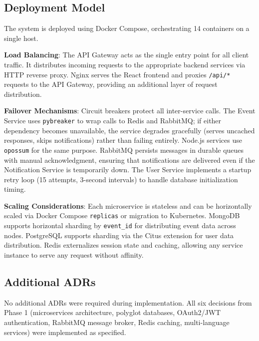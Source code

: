 \documentclass[12pt,a4paper]{article}
\begin{document}
\subsection{Deployment Model}

The system is deployed using Docker Compose, orchestrating 14 containers on a single host.

\textbf{Load Balancing}: The API Gateway acts as the single entry point for all client traffic. It distributes incoming requests to the appropriate backend services via HTTP reverse proxy. Nginx serves the React frontend and proxies \texttt{/api/*} requests to the API Gateway, providing an additional layer of request distribution.

\textbf{Failover Mechanisms}: Circuit breakers protect all inter-service calls. The Event Service uses \texttt{pybreaker} to wrap calls to Redis and RabbitMQ; if either dependency becomes unavailable, the service degrades gracefully (serves uncached responses, skips notifications) rather than failing entirely. Node.js services use \texttt{opossum} for the same purpose. RabbitMQ persists messages in durable queues with manual acknowledgment, ensuring that notifications are delivered even if the Notification Service is temporarily down. The User Service implements a startup retry loop (15 attempts, 3-second intervals) to handle database initialization timing.

\textbf{Scaling Considerations}: Each microservice is stateless and can be horizontally scaled via Docker Compose \texttt{replicas} or migration to Kubernetes. MongoDB supports horizontal sharding by \texttt{event\_id} for distributing event data across nodes. PostgreSQL supports sharding via the Citus extension for user data distribution. Redis externalizes session state and caching, allowing any service instance to serve any request without affinity.

\subsection{Additional ADRs}

No additional ADRs were required during implementation. All six decisions from Phase 1 (microservices architecture, polyglot databases, OAuth2/JWT authentication, RabbitMQ message broker, Redis caching, multi-language services) were implemented as specified.

\newpage

\end{document}
